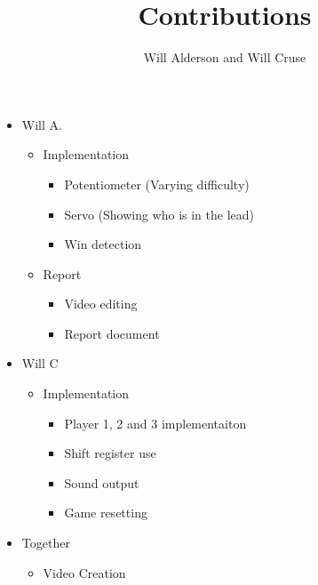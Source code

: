 \documentclass{article}
\title{Contributions}
\author{Will Alderson and Will Cruse}
\begin{document}
  \newpage
{}
  \begin{itemize}
    \item Will A.
      \begin{itemize}
      \item Implementation
        \begin{itemize}
          \item Potentiometer (Varying difficulty)
          \item Servo (Showing who is in the lead)
          \item Win detection 
        \end{itemize}
        \item Report
          \begin{itemize}
            \item Video editing
            \item Report document
        \end{itemize}
      \end{itemize}
    \item Will C
      \begin{itemize}
        \item Implementation
        \begin{itemize}
          \item Player 1, 2 and 3 implementaiton
          \item Shift register use
          \item Sound output
          \item Game resetting
          \end{itemize}
  
      \end{itemize}
    \item Together
      \begin{itemize}
        \item Video Creation
      \end{itemize}
    \end{itemize}
\end{document}
